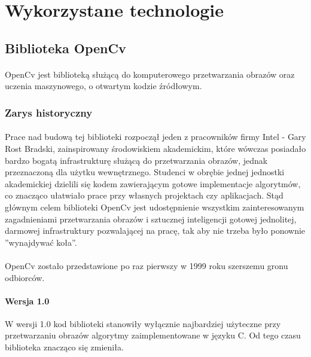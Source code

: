 \documentclass[a4paper,12pt]{article}
\begin{document}
	\newpage 

	\section{Wykorzystane technologie}
		\subsection{Biblioteka OpenCv}
			\paragraph{\noindent} 
				OpenCv jest biblioteką s\l użącą do komputerowego przetwarzania obrazów oraz uczenia maszynowego, 
				o otwartym kodzie źród\l owym.
		\subsubsection{Zarys historyczny}
			\paragraph{\noindent} 
				Prace nad budową tej biblioteki rozpoczął jeden z pracowników firmy Intel - Gary Rost Bradski, zainspirowany środowiskiem akademickim, które wówczas posiadało bardzo bogatą infrastrukturę służącą do przetwarzania obrazów, jednak przeznaczoną dla użytku wewnętrznego. 
				Studenci w obrębie jednej jednostki akademickiej dzielili się kodem zawierającym gotowe implementacje algorytmów, co znacząco ułatwiało prace przy własnych projektach czy aplikacjach. 
				Stąd głównym celem biblioteki OpenCv jest udostępnienie wszystkim zainteresowanym zagadnieniami przetwarzania obrazów i sztucznej inteligencji gotowej jednolitej, darmowej infrastruktury pozwalającej na pracę, tak aby nie trzeba było ponownie ''wynajdywać koła''.

			\paragraph{\noindent}  
				OpenCv zostało przedstawione po raz pierwszy w 1999 roku szerszemu gronu odbiorców. 
 
			\paragraph{\noindent Wersja 1.0}
				W wersji 1.0 kod biblioteki stanowiły wyłącznie najbardziej użyteczne przy przetwarzaniu obrazów
				algorytmy zaimplementowane w języku C. 
				Od tego czasu biblioteka znacząco się zmieniła. 
\end{document}
